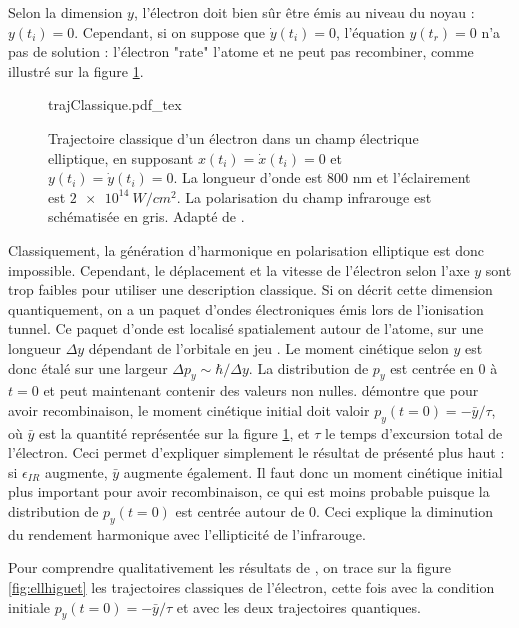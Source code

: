 Selon la dimension $y$, l'électron doit bien sûr être émis au niveau du noyau : $y(t_i) = 0$. Cependant, si on suppose que $\dot{y}(t_i) = 0$, l'équation $y(t_r) = 0$ n'a pas de solution : l'électron "rate" l'atome et ne peut pas recombiner, comme illustré sur la figure \ref{fig:ellgruson}.

\begin{figure}[!ht]
\centering
\def\svgwidth{0.7\columnwidth}
{trajClassique.pdf_tex}
\caption{Trajectoire classique d'un électron dans un champ électrique elliptique, en supposant $x(t_i) = \dot{x}(t_i) = 0$ et $y(t_i) = \dot{y}(t_i) = 0$. La longueur d'onde est 800 nm et l'éclairement est $\SI{2e14}{W/cm^2}$. La polarisation du champ infrarouge est schématisée en gris. Adapté de .}
\label{fig:ellgruson}
\end{figure}

Classiquement, la génération d'harmonique en polarisation elliptique est donc impossible. Cependant, le déplacement et la vitesse de l'électron selon l'axe $y$ sont trop faibles pour utiliser une description classique. Si on décrit cette dimension quantiquement, on a un paquet d'ondes électroniques émis lors de l'ionisation tunnel. Ce paquet d'onde est localisé spatialement autour de l'atome, sur une longueur $\Delta y$ dépendant de l'orbitale en jeu . Le moment cinétique selon $y$ est donc étalé sur une largeur $\Delta p_y\sim\hbar/\Delta y$. La distribution de $p_y$ est centrée en 0 à $t=0$ et peut maintenant contenir des valeurs non nulles.  démontre que pour avoir recombinaison, le moment cinétique initial doit valoir $p_y(t=0) = -\bar{y}/\tau$, où $\bar{y}$ est la quantité représentée sur la figure \ref{fig:ellgruson}, et $\tau$ le temps d'excursion total de l'électron. Ceci permet d'expliquer simplement le résultat de  présenté plus haut : si $\epsilon_{IR}$ augmente, $\bar{y}$ augmente également. Il faut donc un moment cinétique initial plus important pour avoir recombinaison, ce qui est moins probable puisque la distribution de $p_y(t=0)$ est centrée autour de 0. Ceci explique la diminution du rendement harmonique avec l'ellipticité de l'infrarouge.

Pour comprendre qualitativement les résultats de , on trace sur la figure \ref{fig:ellhiguet} les trajectoires classiques de l'électron, cette fois avec la condition initiale $p_y(t=0) = -\bar{y}/\tau$ et avec les deux trajectoires quantiques.

